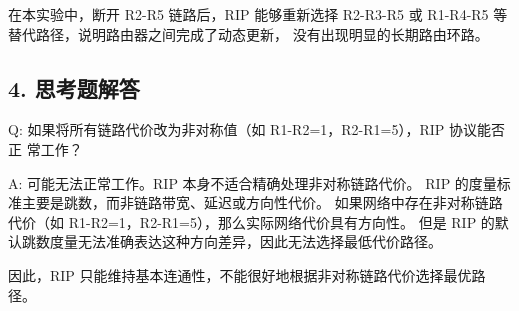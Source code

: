 \documentclass[11pt]{article}
\begin{document}
在本实验中，断开 R2-R5 链路后，RIP 能够重新选择 R2-R3-R5 或 R1-R4-R5 等替代路径，说明路由器之间完成了动态更新，
没有出现明显的长期路由环路。

\subsection*{4. 思考题解答}
Q: 如果将所有链路代价改为非对称值（如 R1-R2=1，R2-R1=5），RIP 协议能否正
常工作？

A: 可能无法正常工作。RIP 本身不适合精确处理非对称链路代价。
RIP 的度量标准主要是跳数，而非链路带宽、延迟或方向性代价。
如果网络中存在非对称链路代价（如 R1-R2=1，R2-R1=5），那么实际网络代价具有方向性。
但是 RIP 的默认跳数度量无法准确表达这种方向差异，因此无法选择最低代价路径。

因此，RIP 只能维持基本连通性，不能很好地根据非对称链路代价选择最优路径。
\end{document}
